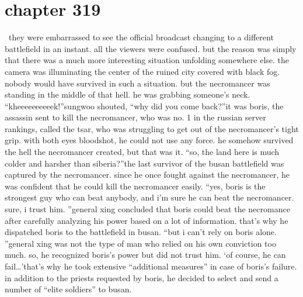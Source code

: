 \section{chapter 319}






 they were embarrassed to see the official broadcast changing to a different battlefield in an instant.
 all the viewers were confused.
but the reason was simply that there was a much more interesting situation unfolding somewhere else.
 the camera was illuminating the center of the ruined city covered with black fog.
 nobody would have survived in such a situation.
 but the necromancer was standing in the middle of that hell.
 he was grabbing someone’s neck.
“kheeeeeeeeeek!”sungwoo shouted, “why did you come back?”it was boris, the assassin sent to kill the necromancer, who was no.
 1 in the russian server rankings, called the tsar, who was struggling to get out of the necromancer’s tight grip.
with both eyes bloodshot, he could not use any force.
 he somehow survived the hell the necromancer created, but that was it.
“so, the land here is much colder and harsher than siberia?”the last survivor of the busan battlefield was captured by the necromancer.
since he once fought against the necromancer, he was confident that he could kill the necromancer easily.
“yes, boris is the strongest guy who can beat anybody, and i’m sure he can beat the necromancer.
 sure, i trust him.
”general xing concluded that boris could beat the necromance after carefully analyzing his power based on a lot of information.
 that’s why he dispatched boris to the battlefield in busan.
“but i can’t rely on boris alone.
”general xing was not the type of man who relied on his own conviction too much.
 so, he recognized boris’s power but did not trust him.
‘of course, he can fail…’that’s why he took extensive “additional measures” in case of boris’s failure.
 in addition to the priests requested by boris, he decided to select and send a number of “elite soldiers” to busan.

